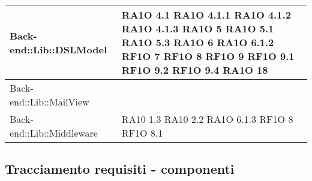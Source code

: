 \begin{center}
\begin{longtable}{|p{5cm}|p{3cm}|}
			Back-end::Lib::DSLModel & RA1O 4.1 \newline RA1O 4.1.1 \newline RA1O 4.1.2 \newline  RA1O 4.1.3 \newline
			RA1O 5 \newline RA1O 5.1 \newline RA1O 5.3 \newline RA1O 6 \newline RA1O 6.1.2 \newline RF1O 7 \newline RF1O 8 \newline		
			RF1O 9 \newline	RF1O 9.1 \newline RF1O 9.2 \newline	RF1O 9.4 \newline RA1O 18 \newline	
			\\ \hline
			
			
			Back-end::Lib::MailView & 		\\ \hline
			
			Back-end::Lib::Middleware & RA10 1.3 \newline RA10 2.2 \newline RA1O 6.1.3 \newline RF1O 8 \newline RF1O 8.1 \newline		\\ \hline

   \end{longtable}
      \egroup
      \end{center}  
\clearpage

\subsection{Tracciamento requisiti - componenti}

